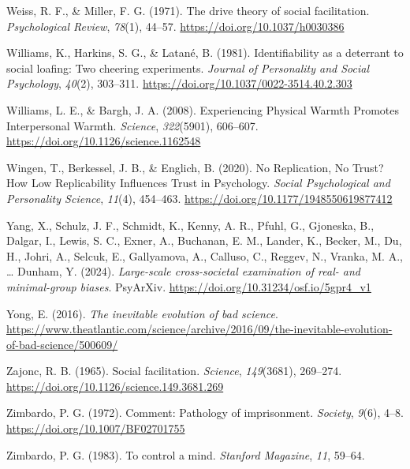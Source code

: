 \documentclass[
  letterpaper,
]{book}
\newlength{\cslhangindent}
\newenvironment{CSLReferences}[2] %
 {\begin{list}{}{%
  \setlength{\itemindent}{0pt}
  \setlength{\leftmargin}{0pt}
  \setlength{\parsep}{0pt}
  \ifodd #1
   \setlength{\leftmargin}{\cslhangindent}
   \setlength{\itemindent}{-1\cslhangindent}
  \fi
  \setlength{\itemsep}{#2\baselineskip}}}
 {\end{list}}
\begin{document}
\begin{CSLReferences}{1}{0}
Weiss, R. F., \& Miller, F. G. (1971). The drive theory of social
facilitation. \emph{Psychological Review}, \emph{78}(1), 44--57.
\url{https://doi.org/10.1037/h0030386}

Williams, K., Harkins, S. G., \& Latané, B. (1981). Identifiability as a
deterrant to social loafing: {Two} cheering experiments. \emph{Journal
of Personality and Social Psychology}, \emph{40}(2), 303--311.
\url{https://doi.org/10.1037/0022-3514.40.2.303}

Williams, L. E., \& Bargh, J. A. (2008). Experiencing {Physical}
{Warmth} {Promotes} {Interpersonal} {Warmth}. \emph{Science},
\emph{322}(5901), 606--607.
\url{https://doi.org/10.1126/science.1162548}

Wingen, T., Berkessel, J. B., \& Englich, B. (2020). No {Replication},
{No} {Trust}? {How} {Low} {Replicability} {Influences} {Trust} in
{Psychology}. \emph{Social Psychological and Personality Science},
\emph{11}(4), 454--463. \url{https://doi.org/10.1177/1948550619877412}

Yang, X., Schulz, J. F., Schmidt, K., Kenny, A. R., Pfuhl, G., Gjoneska,
B., Dalgar, I., Lewis, S. C., Exner, A., Buchanan, E. M., Lander, K.,
Becker, M., Du, H., Johri, A., Selcuk, E., Gallyamova, A., Calluso, C.,
Reggev, N., Vranka, M. A., \ldots{} Dunham, Y. (2024). \emph{Large-scale
cross-societal examination of real- and minimal-group biases}. PsyArXiv.
\url{https://doi.org/10.31234/osf.io/5gpr4_v1}

Yong, E. (2016). \emph{The inevitable evolution of bad science}.
\url{https://www.theatlantic.com/science/archive/2016/09/the-inevitable-evolution-of-bad-science/500609/}

Zajonc, R. B. (1965). Social facilitation. \emph{Science},
\emph{149}(3681), 269--274.
\url{https://doi.org/10.1126/science.149.3681.269}

Zimbardo, P. G. (1972). Comment: {Pathology} of imprisonment.
\emph{Society}, \emph{9}(6), 4--8.
\url{https://doi.org/10.1007/BF02701755}

Zimbardo, P. G. (1983). To control a mind. \emph{Stanford Magazine},
\emph{11}, 59--64.

\end{CSLReferences}
\end{document}
